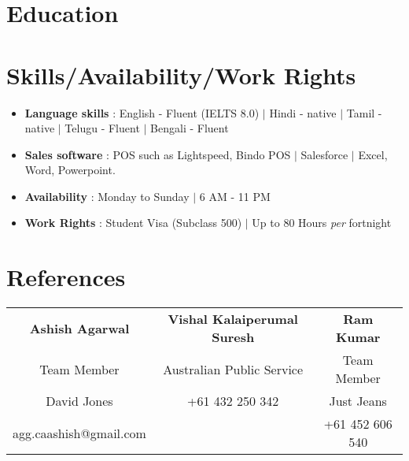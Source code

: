 \documentclass{resume_class}
\begin{document}
	\section{Education}
	\section{Skills/Availability/Work Rights}
	\begin{itemize}[leftmargin = 10pt , labelsep = 3pt , parsep = 0pt , itemsep = 1pt , label =  {\small $\bullet$} ] 
		\item \mdseries \Large { \textbf{Language skills} : English - Fluent (IELTS 8.0) $|$ Hindi - native $|$ Tamil - native $|$ Telugu - Fluent $|$ Bengali - Fluent   }
		\item \mdseries \Large  {\textbf{Sales software} : POS such as Lightspeed, Bindo POS $|$ Salesforce $|$ Excel, Word, Powerpoint. }
		\item \mdseries \Large {\textbf{Availability} : Monday to Sunday $|$ 6 AM - 11 PM}
		\item \mdseries \Large {\textbf{Work Rights} : Student Visa (Subclass 500)  $|$ Up to 80 Hours \textit{per} fortnight}
		
	\end{itemize}
	
	\section{References}
	\begin{tabular}{|c|c|c|} 
		\textbf{Ashish Agarwal}  & \textbf{Vishal Kalaiperumal Suresh} & \textbf{Ram Kumar} \\
		Team Member & Australian Public Service & Team Member \\  
		David Jones & +61 432 250 342 & Just Jeans\\
		agg.caashish@gmail.com & & +61 452 606 540
	\end{tabular}	
\end{document}
